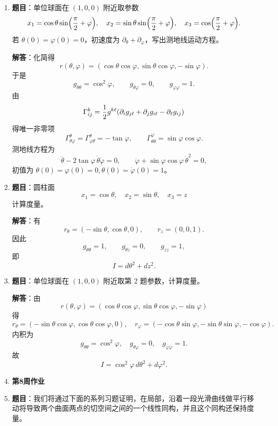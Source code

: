 \documentclass[UTF8,12pt,a4paper]{ctexart}
\newcommand{\homeworkweek}[1]{%
  \item[]\vspace{0.35em}\noindent\textbf{\large #1}\vspace{0.15em}
}
\begin{document}
\begin{enumerate}
\textbf{解答}：参数向量为
\[
\partial_\theta=(-\sin\theta,\cos\theta,0),\qquad \partial_3=(0,0,1).
\]
第一基本形式为
\[
g_{\theta\theta}=1,\quad g_{\theta 3}=0,\quad g_{33}=1,
\]
故 $g$ 为常数矩阵，Christoffel 记号全为零。自由质点即测地线，方程为
\[
\ddot\theta=0,\qquad \ddot x_3=0.
\]
由初始条件 $\dot\theta(0)=1,\dot x_3(0)=1$ 得
\[
\boxed{\theta(t)=t,\qquad x_3(t)=t.}
\]
代回圆柱面为
\[
\boxed{r(t)=(\cos t,\sin t,t).}
\]

\item \textbf{题目}：单位球面在 $(1,0,0)$ 附近取参数
\[
x_1=\cos\theta\sin\Bigl({\pi\over2}+\varphi\Bigr),\quad
x_2=\sin\theta\sin\Bigl({\pi\over2}+\varphi\Bigr),\quad
x_3=\cos\Bigl({\pi\over2}+\varphi\Bigr).
\]
若 $\theta(0)=\varphi(0)=0$，初速度为 $\partial_\theta+\partial_\varphi$，写出测地线运动方程。

\textbf{解答}：化简得
\[
r(\theta,\varphi)=(\cos\theta\cos\varphi,\sin\theta\cos\varphi,-\sin\varphi).
\]
于是
\[
g_{\theta\theta}=\cos^2\varphi,\qquad g_{\theta\varphi}=0,\qquad g_{\varphi\varphi}=1.
\]
由
\[
\Gamma^k_{ij}={1\over2}g^{k\ell}(\partial_i g_{j\ell}+\partial_j g_{i\ell}-\partial_\ell g_{ij})
\]
得唯一非零项
\[
\Gamma^\theta_{\theta\varphi}=\Gamma^\theta_{\varphi\theta}=-\tan\varphi,\qquad
\Gamma^\varphi_{\theta\theta}=\sin\varphi\cos\varphi.
\]
测地线方程为
\[
\boxed{\ddot\theta-2\tan\varphi\,\dot\theta\dot\varphi=0,}
\qquad
\boxed{\ddot\varphi+\sin\varphi\cos\varphi\,\dot\theta^2=0,}
\]
初值为 $\theta(0)=\varphi(0)=0,\dot\theta(0)=\dot\varphi(0)=1$。

\item \textbf{题目}：圆柱面
\[
x_1=\cos\theta,\quad x_2=\sin\theta,\quad x_3=z
\]
计算度量。

\textbf{解答}：有
\[
r_\theta=(-\sin\theta,\cos\theta,0),\qquad r_z=(0,0,1).
\]
因此
\[
g_{\theta\theta}=1,\qquad g_{\theta z}=0,\qquad g_{zz}=1,
\]
即
\[
\boxed{I=d\theta^2+dz^2.}
\]

\item \textbf{题目}：单位球面在 $(1,0,0)$ 附近取第 2 题参数，计算度量。

\textbf{解答}：由
\[
r(\theta,\varphi)=(\cos\theta\cos\varphi,\sin\theta\cos\varphi,-\sin\varphi)
\]
得
\[
r_\theta=(-\sin\theta\cos\varphi,\cos\theta\cos\varphi,0),\quad
r_\varphi=(-\cos\theta\sin\varphi,-\sin\theta\sin\varphi,-\cos\varphi).
\]
内积为
\[
g_{\theta\theta}=\cos^2\varphi,\quad g_{\theta\varphi}=0,\quad g_{\varphi\varphi}=1.
\]
故
\[
\boxed{I=\cos^2\varphi\,d\theta^2+d\varphi^2.}
\]

\homeworkweek{第8周作业}
\item \textbf{题目}：我们将通过下面的系列习题证明，在局部，沿着一段光滑曲线做平行移动将导致两个曲面两点的切空间之间的一个线性同构，并且这个同构还保持度量。


\end{enumerate}
\end{document}
